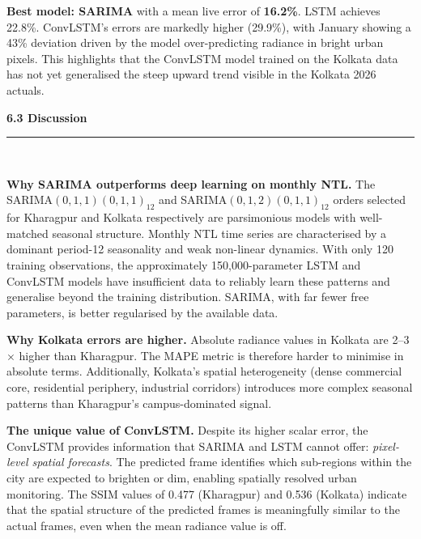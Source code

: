 \documentclass[12pt,a4paper]{report}
\begin{document}
\textbf{Best model: SARIMA} with a mean live error of \textbf{16.2\%}. LSTM achieves 22.8\%. ConvLSTM's errors are markedly higher (29.9\%), with January showing a 43\% deviation driven by the model over-predicting radiance in bright urban pixels. This highlights that the ConvLSTM model trained on the Kolkata data has not yet generalised the steep upward trend visible in the Kolkata 2026 actuals.

\vspace{0.5cm}
\begin{center}
    \hypertarget{sec:s63}{}%
    {\large \textbf{6.3 Discussion}}\\[0.3cm]
    \noindent\rule{\linewidth}{0.4pt}\\[0.5cm]
\end{center}

\textbf{Why SARIMA outperforms deep learning on monthly NTL.} The SARIMA$(0,1,1)(0,1,1)_{12}$ and SARIMA$(0,1,2)(0,1,1)_{12}$ orders selected for Kharagpur and Kolkata respectively are parsimonious models with well-matched seasonal structure. Monthly NTL time series are characterised by a dominant period-12 seasonality and weak non-linear dynamics. With only 120 training observations, the approximately 150,000-parameter LSTM and ConvLSTM models have insufficient data to reliably learn these patterns and generalise beyond the training distribution. SARIMA, with far fewer free parameters, is better regularised by the available data.

\textbf{Why Kolkata errors are higher.} Absolute radiance values in Kolkata are 2--3$\times$ higher than Kharagpur. The MAPE metric is therefore harder to minimise in absolute terms. Additionally, Kolkata's spatial heterogeneity (dense commercial core, residential periphery, industrial corridors) introduces more complex seasonal patterns than Kharagpur's campus-dominated signal.

\textbf{The unique value of ConvLSTM.} Despite its higher scalar error, the ConvLSTM provides information that SARIMA and LSTM cannot offer: \emph{pixel-level spatial forecasts}. The predicted frame identifies which sub-regions within the city are expected to brighten or dim, enabling spatially resolved urban monitoring. The SSIM values of 0.477 (Kharagpur) and 0.536 (Kolkata) indicate that the spatial structure of the predicted frames is meaningfully similar to the actual frames, even when the mean radiance value is off.
\end{document}
